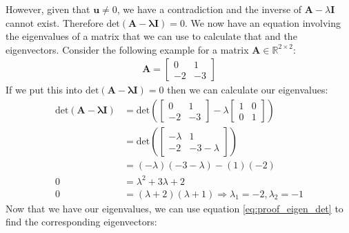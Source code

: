 \documentclass[a4paper,12pt]{book}
\newcommand{\matrx}[1]{\bm{#1}}
\newcommand{\vectr}[1]{\textbf{#1}}
\newcommand{\real}{\mathbb{R}}
\newcommand{\dett}[1]{\text{det}(\matrx{#1})}
\newcommand{\mdett}[1]{\text{det} \left ( #1 \right )}
\begin{document}
	However, given that $ \vectr{u} \ne 0 $, we have a contradiction and the inverse of $ \matrx{A} - \lambda \matrx{I} $ cannot exist. Therefore $ \dett{\matrx{A} - \lambda \matrx{I}} = 0 $.
	We now have an equation involving the eigenvalues of a matrix that we can use to calculate that and the eigenvectors. Consider the following example for a matrix $ \matrx{A} \in \real^{2 \times 2} $:
	\begin{align}
		\matrx{A} = \begin{bmatrix}
			0 & 1 \\
		   -2 & -3 
		\end{bmatrix}
	\end{align}
	If we put this into $ \dett{\matrx{A} - \lambda \matrx{I}} = 0 $ then we can calculate our eigenvalues:
	\begin{align}
		\dett{\matrx{A} - \lambda \matrx{I}} &= \mdett{\begin{bmatrix}
				0 & 1 \\
				-2 & -3 
			\end{bmatrix} - \lambda \begin{bmatrix}
				1 & 0 \\
				0 & 1
		\end{bmatrix}} \\ &= \mdett{\begin{bmatrix}
				-\lambda & 1 \\
				-2 & -3 - \lambda
		\end{bmatrix}} \\
		&= (-\lambda)(-3-\lambda) - (1)(-2) \\
		\label{eq:char_det} 0 &= \lambda^{2} + 3\lambda + 2 \\
		0 &= (\lambda + 2)(\lambda + 1) \Rightarrow \lambda_1 = -2, \lambda_2 = -1
	\end{align}
	Now that we have our eigenvalues, we can use equation \ref{eq:proof_eigen_det} to find the corresponding eigenvectors:
\end{document}
